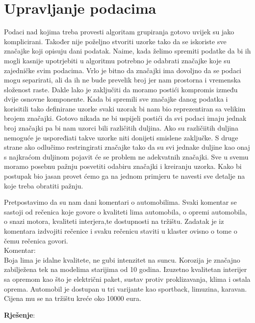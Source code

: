 \documentclass[a4paper,twoside,12pt]{memoir} %
\begin{document}
\section[Upravljanje podacima][upravljanje-podacima]{Upravljanje podacima}
\label{sec:upravljanje-pod}
Podaci nad kojima treba provesti algoritam grupiranja gotovo uvijek su jako komplicirani. Također nije poželjno stvoriti uzorke tako da se iskoriste sve značajke koji opisuju dani podatak. Naime, kada želimo spremiti podatke da bi ih mogli kasnije upotrjebiti u algoritmu potrebno je odabrati značajke koje su zajedničke svim podacima. Vrlo je bitno da značajki ima dovoljno da se podaci mogu separirati, ali da ih ne bude prevelik broj jer nam prostorna i vremenska složenost raste. Dakle lako je zaključiti da moramo postići kompromis između dvije osnovne komponente. Kada bi spremili sve značajke danog podatka i korisitili tako definirane uzorke svaki uzorak bi nam bio reprezentiran sa velikim brojem značajki. Gotovo nikada ne bi uspijeli postići da svi podaci imaju jednak broj značajki pa bi nam uzorci bili različitih duljina. Ako su različiitih duljina nemoguće je uspoređiati takve uzorke niti donijeti smislene zaključke. S druge strane ako odlučimo restringirati značajke tako da su svi jednake duljine kao onaj s najkraćom duljinom pojavit će se problem ne adekvatnih značajki. Sve u svemu moramo posebnu pažnju posvetiti odabiru značajki i kreiranju uzorka. Kako bi postupak bio jasan provet ćemo ga na jednom primjeru te navesti sve detalje na koje treba obratiti pažnju.\\
\begin{exa}
Pretpostavimo da su nam dani komentari o automobilima. Svaki komentar se sastoji od rečenica koje govore o kvaliteti lima automobila, o opremi automobila, o snazi motora, kvaliteti interjera,te dostupnosti na tržištu. Zadatak je iz komentara izdvojiti rečenice i svaku rečenicu staviti u klaster ovisno o tome o čemu rečenica govori.
\\
Komentar:\\
Boja lima je idalne kvalitete, ne gubi intenzitet na suncu. Korozija je značajno zabilježena tek na modelima starijima od 10 godina. Izuzetno kvalitetan interijer sa opremom kao što je električni paket, sustav protiv proklizavanja, klima i ostala oprema. Automobil je dostupan u tri varijante kao sportback, limuzina, karavan. Cijena mu se na tržištu kreće oko 10000 eura.
\\
\end{exa}
\textbf{Rješenje}:
\\
\end{document}
